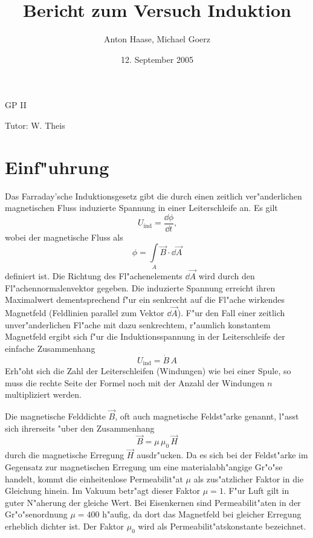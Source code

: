 \documentclass[a4paper,10pt]{article}
\title{Bericht zum Versuch Induktion}
\author{Anton Haase, Michael Goerz}
\date{12. September 2005}
\begin{document}
\maketitle
\noindent GP II

\noindent Tutor: W. Theis

\section{Einf"uhrung}
Das Farraday'sche Induktionsgesetz gibt die durch einen zeitlich ver"anderlichen magnetischen Fluss induzierte Spannung in einer Leiterschleife an. Es gilt
\begin{equation}
U_{\text{ind}} = \frac{\dd \phi}{\dd t}\text{,}
\end{equation}
wobei der magnetische Fluss als
\begin{equation}
\phi = \int \limits_{A} \vec{B} \cdot \dd \vec{A}
\end{equation}
definiert ist. Die Richtung des Fl"achenelements $\dd \vec{A}$ wird durch den Fl"achennormalenvektor gegeben. Die induzierte Spannung erreicht ihren Maximalwert dementsprechend f"ur ein senkrecht auf die Fl"ache wirkendes Magnetfeld (Feldlinien parallel zum Vektor $\dd \vec{A}$). F"ur den Fall einer zeitlich unver"anderlichen Fl"ache mit dazu senkrechtem, r"aumlich konstantem Magnetfeld ergibt sich f"ur die Induktionsspannung in der Leiterschleife der einfache Zusammenhang
\begin{equation}
U_{\text{ind}} = \dot{B} \, A
\end{equation}
Erh"oht sich die Zahl der Leiterschleifen (Windungen) wie bei einer Spule, so muss die rechte Seite der Formel noch mit der Anzahl der Windungen $n$ multipliziert werden.

Die magnetische Felddichte $\vec{B}$, oft auch magnetische Feldst"arke genannt, l"asst sich ihrerseits "uber den Zusammenhang
\begin{equation}
\vec{B} = \mu \, \mu_0 \, \vec{H}
\end{equation}
durch die magnetische Erregung $\vec{H}$ ausdr"ucken. Da es sich bei der Feldst"arke im Gegensatz zur magnetischen Erregung um eine materialabh"angige Gr"o"se handelt, kommt die einheitenlose Permeabilit"at $\mu$ als zus"atzlicher Faktor in die Gleichung hinein. Im Vakuum betr"agt dieser Faktor $\mu = 1$. F"ur Luft gilt in guter N"aherung der gleiche Wert. Bei Eisenkernen sind Permeabilit"aten in der Gr"o"senordnung $\mu = 400$ h"aufig, da dort das Magnetfeld bei gleicher Erregung erheblich dichter ist. Der Faktor $\mu_0$ wird als Permeabilit"atskonstante bezeichnet.
\end{document}
